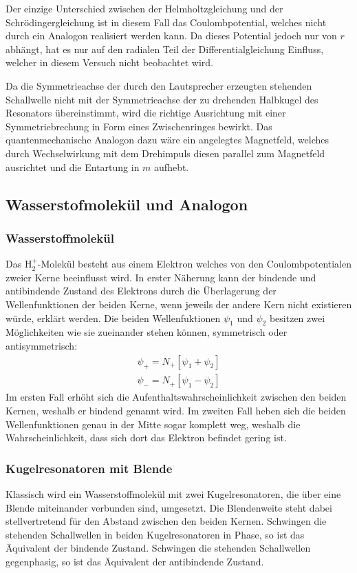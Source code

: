             Der einzige Unterschied zwischen der Helmholtzgleichung und der Schrödingergleichung ist in diesem Fall das Coulombpotential, welches nicht durch ein Analogon realisiert werden kann.
            Da dieses Potential jedoch nur von $r$ abhängt, hat es nur auf den radialen Teil der Differentialgleichung Einfluss, welcher in diesem Versuch nicht beobachtet wird.

            Da die Symmetrieachse der durch den Lautsprecher erzeugten stehenden Schallwelle nicht mit der Symmetrieachse der zu drehenden Halbkugel des Resonators übereinstimmt, wird die richtige Ausrichtung mit einer Symmetriebrechung in Form eines Zwischenringes bewirkt.
            Das quantenmechanische Analogon dazu wäre ein angelegtes Magnetfeld, welches durch Wechselwirkung mit dem Drehimpuls diesen parallel zum Magnetfeld ausrichtet und die Entartung in $m$ aufhebt.

    \subsection{Wasserstofmolekül und Analogon}
        \subsubsection*{Wasserstoffmolekül}
            Das $\text{H}^+_2$-Molekül besteht aus einem Elektron welches von den Coulombpotentialen zweier Kerne beeinflusst wird.
            In erster Näherung kann der bindende und antibindende Zustand des Elektrons durch die Überlagerung der Wellenfunktionen der beiden Kerne, wenn jeweils der andere Kern nicht existieren würde, erklärt werden.
            Die beiden Wellenfuktionen $\psi_1$ und $\psi_2$ besitzen zwei Möglichkeiten wie sie zueinander stehen können, symmetrisch oder antisymmetrisch:
            \begin{align*}
                \psi_+ = N_+ [\psi_1 + \psi_2] \\
                \psi_- = N_+ [\psi_1 - \psi_2]
            \end{align*}
            Im ersten Fall erhöht sich die Aufenthaltswahrscheinlichkeit zwischen den beiden Kernen, weshalb er bindend genannt wird.
            Im zweiten Fall heben sich die beiden Wellenfunktionen genau in der Mitte sogar komplett weg, weshalb die Wahrscheinlichkeit, dass sich dort das Elektron befindet gering ist.

        \subsubsection*{Kugelresonatoren mit Blende}
            Klassisch wird ein Wasserstoffmolekül mit zwei Kugelresonatoren, die über eine Blende miteinander verbunden sind, umgesetzt.
            Die Blendenweite steht dabei stellvertretend für den Abstand zwischen den beiden Kernen.
            Schwingen die stehenden Schallwellen in beiden Kugelresonatoren in Phase, so ist das Äquivalent der bindende Zustand.
            Schwingen die stehenden Schallwellen gegenphasig, so ist das Äquivalent der antibindende Zustand.
            

